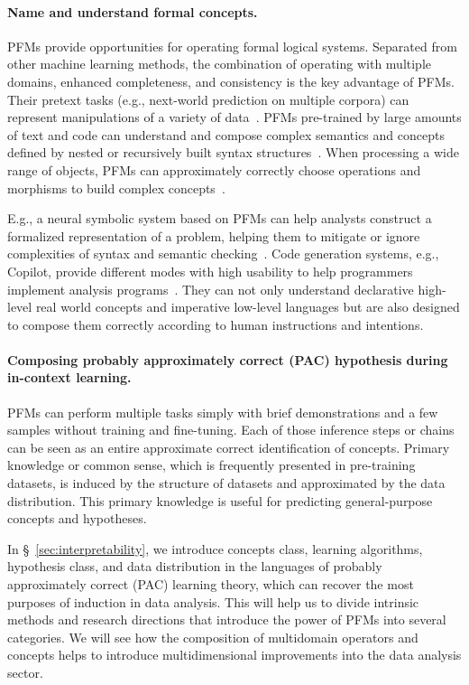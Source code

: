   \paragraph{\textbf{Name and understand formal concepts.}} PFMs provide opportunities for operating formal logical systems. Separated from other machine learning methods, the combination of operating with multiple domains, enhanced completeness, and consistency is the key advantage of PFMs. Their pretext tasks (e.g., next-world prediction on multiple corpora) can represent manipulations of a variety of data~\cite{yuan2023power}. PFMs pre-trained by large amounts of text and code can understand and compose complex semantics and concepts defined by nested or recursively built syntax structures~\cite{phi1}. When processing a wide range of objects, PFMs can approximately correctly choose operations and morphisms to build complex concepts~\cite{009brown2020language}. 
  
 E.g., a neural symbolic system based on PFMs can help analysts construct a formalized representation of a problem, helping them to mitigate or ignore complexities of syntax and semantic checking~\cite{Bavishi2022NeurosymbolicRF}. Code generation systems, e.g., Copilot, provide different modes with high usability to help programmers implement analysis programs~\cite{Barke2022GroundedCH}. They can not only understand declarative high-level real world concepts and imperative low-level languages but are also designed to compose them correctly according to human instructions and intentions. 
  
  \paragraph{\textbf{Composing probably approximately correct (PAC) hypothesis during in-context learning.}} PFMs can perform multiple tasks simply with brief demonstrations and a few samples without training and fine-tuning. Each of those inference steps or chains can be seen as an entire approximate correct identification of concepts. Primary knowledge or common sense, which is frequently presented in pre-training datasets, is induced by the structure of datasets and approximated by the data distribution. This primary knowledge is useful for predicting general-purpose concepts and hypotheses. 
  
  In \S~\ref{sec:interpretability}, we introduce concepts class, learning algorithms, hypothesis class, and data distribution in the languages of probably approximately correct (PAC) learning theory, which can recover the most purposes of induction in data analysis. This will help us to divide intrinsic methods and research directions that introduce the power of PFMs into several categories. We will see how the composition of multidomain operators and concepts helps to introduce multidimensional improvements into the data analysis sector.
  
